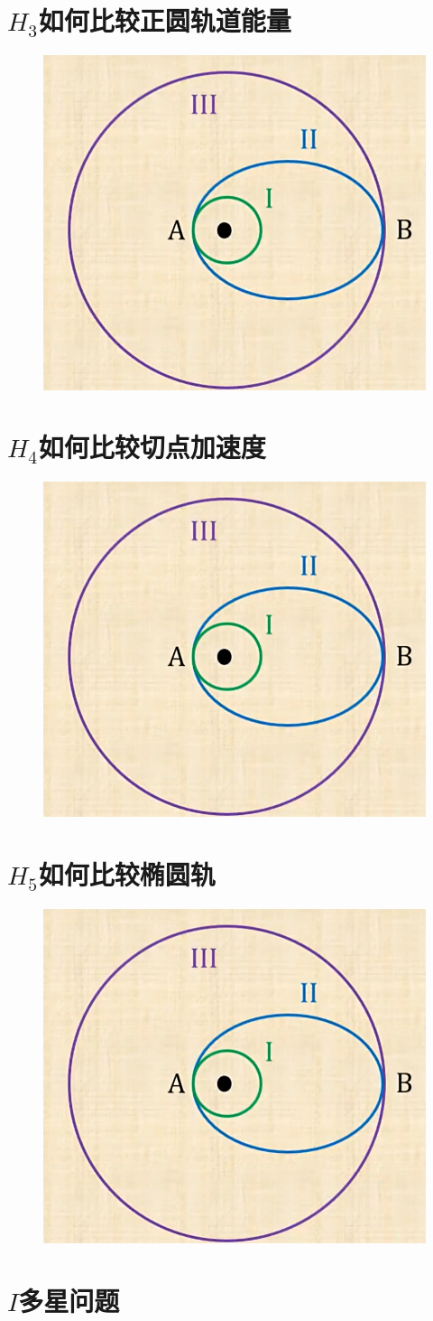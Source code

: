 \documentclass[lang=cn,10pt]{elegantbook}
\begin{document}
	       \section{$H_3$如何比较正圆轨道能量}
	       \begin{figure}[H]
	       	\centering
	       	\includegraphics[width=0.3\linewidth]{image/54}
	       \end{figure}
	       
	       \section{$H_4$如何比较切点加速度}
	       \begin{figure}[H]
	       	\centering
	       	\includegraphics[width=0.3\linewidth]{image/54}
	       \end{figure}
	       
	       \section{$H_5$如何比较椭圆轨}
	       \begin{figure}[H]
	       	\centering
	       	\includegraphics[width=0.3\linewidth]{image/54}
	       \end{figure}
	       \section{$I$多星问题}
\end{document}
